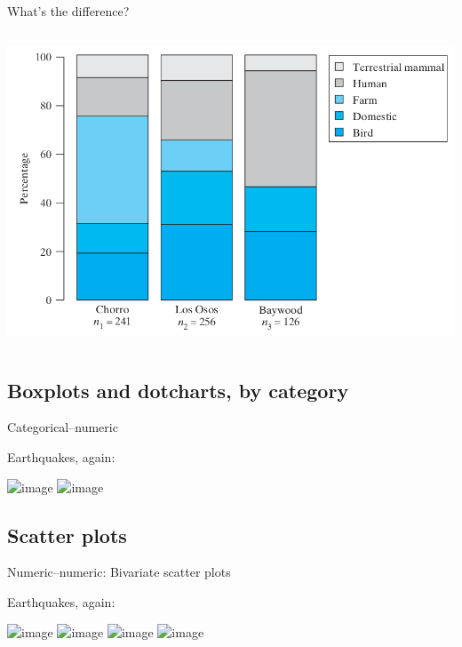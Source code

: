 \begin{frame}{What's the difference?}
\begin{columns}
\begin{column}{0.5\textwidth}
\begin{center}
            \includegraphics[width=.9\textwidth]{ecoli-freqs-fig2_5_2.png}
    \end{center}
\end{column}
\end{columns}

\end{frame}


\subsection{Boxplots and dotcharts, by category}

\begin{frame}{Categorical--numeric}

    Earthquakes, again:
    \begin{center}
        \includegraphics<1>[width=\textwidth]{quakes-category-dotplot}
        \includegraphics<2>[width=\textwidth]{quakes-category-boxplot}
    \end{center}

\end{frame}


\subsection{Scatter plots}

\begin{frame}{Numeric--numeric: Bivariate scatter plots}

  Earthquakes, again:
  \begin{center}
    \includegraphics<1>{quakes-mag-depth}
    \includegraphics<2>{quakes-mag-depth-lines}
    \includegraphics<3>{quakes-mag-time}
    \includegraphics<4>{quakes-mag-time-lines}
  \end{center}


\end{frame}


